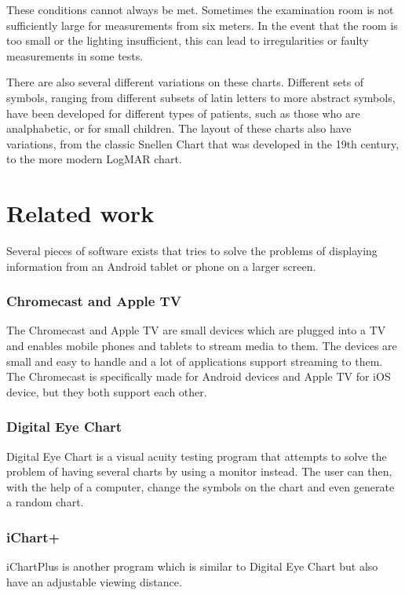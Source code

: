 \documentclass[12pt,a4paper,notitlepage]{report}
\begin{document}
These conditions cannot always be met. Sometimes the examination room is not sufficiently large for measurements from six meters. In the event that the room is too small or the lighting insufficient, this can lead to irregularities or faulty measurements in some tests.

There are also several different variations on these charts. Different sets of symbols, ranging from different subsets of latin letters to more abstract symbols, have been developed for different types of patients, such as those who are analphabetic, or for small children. The layout of these charts also have variations, from the classic Snellen Chart that was developed in the 19th century, to the more modern LogMAR chart.

\section{Related work}
Several pieces of software exists that tries to solve the problems of displaying information from an Android tablet or phone on a larger screen. 

\subsubsection{Chromecast and Apple TV}
The Chromecast \cite{chromecast} and Apple TV \cite{appletv} are small devices which are plugged into a TV and enables mobile phones and tablets to stream media to them. The devices are small and easy to handle and a lot of applications support streaming to them. The Chromecast is specifically made for Android devices and Apple TV for iOS device, but they both support each other.

\subsubsection{Digital Eye Chart}
 Digital Eye Chart \cite{digitaleyechart} is a visual acuity testing program that attempts to solve the problem of having several charts by using a monitor instead. The user can then, with the help of a computer, change the symbols on the chart and even generate a random chart. 

\subsubsection{iChart+}
iChartPlus \cite{ichartplus} is another program which is similar to Digital Eye Chart but also have an adjustable viewing distance. 
\end{document}
